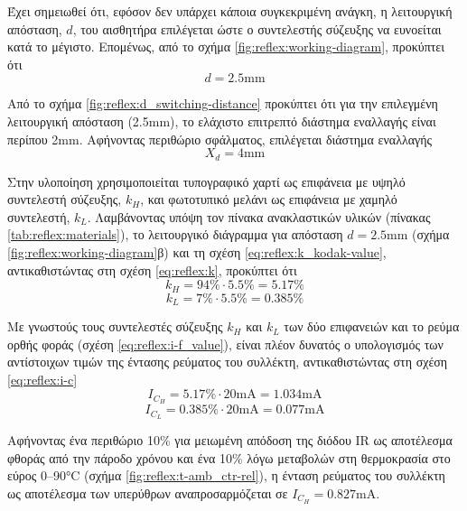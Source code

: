 Έχει σημειωθεί ότι, εφόσον δεν υπάρχει κάποια συγκεκριμένη ανάγκη, η λειτουργική
απόσταση, $d$, του αισθητήρα επιλέγεται ώστε ο συντελεστής σύζευξης να ευνοείται
κατά το μέγιστο. Επομένως, από το σχήμα \ref{fig:reflex:working-diagram},
προκύπτει ότι
\begin{equation}
d = 2.5 \text{mm}
\end{equation}

Από το σχήμα \ref{fig:reflex:d_switching-distance} προκύπτει ότι για την
επιλεγμένη λειτουργική απόσταση (2.5mm), το ελάχιστο επιτρεπτό διάστημα
εναλλαγής είναι περίπου 2mm. Αφήνοντας περιθώριο σφάλματος, επιλέγεται διάστημα
εναλλαγής
\begin{equation}
X_d = 4 \text{mm}
\end{equation}

Στην υλοποίηση χρησιμοποιείται τυπογραφικό χαρτί ως επιφάνεια με υψηλό
συντελεστή σύζευξης, $k_H$, και φωτοτυπικό μελάνι ως επιφάνεια με χαμηλό
συντελεστή, $k_L$.
Λαμβάνοντας υπόψη τον πίνακα ανακλαστικών υλικών
(πίνακας \ref{tab:reflex:materials}), το
λειτουργικό διάγραμμα για απόσταση $d = 2.5$mm
(σχήμα \ref{fig:reflex:working-diagram}β) και τη σχέση
\eqref{eq:reflex:k_kodak-value}, αντικαθιστώντας στη σχέση \eqref{eq:reflex:k},
προκύπτει ότι
\begin{equation}
k_H = 94 \% \cdot 5.5 \% = 5.17 \%
\end{equation}
\begin{equation}
k_L = 7 \% \cdot 5.5 \% = 0.385 \%
\end{equation}

Με γνωστούς τους συντελεστές σύζευξης $k_H$ και $k_L$ των δύο επιφανειών και το
ρεύμα ορθής φοράς (σχέση \eqref{eq:reflex:i-f_value}), είναι πλέον δυνατός ο
υπολογισμός των αντίστοιχων τιμών της έντασης ρεύματος του συλλέκτη,
αντικαθιστώντας στη σχέση \eqref{eq:reflex:i-c}
\begin{equation}
I_{C_H} = 5.17\% \cdot 20 \text{mA} = 1.034 \text{mA}
\end{equation}
\begin{equation}
I_{C_L} = 0.385\% \cdot 20 \text{mA} = 0.077 \text{mA}
\end{equation}

Αφήνοντας ένα περιθώριο 10\% για μειωμένη απόδοση της διόδου IR ως αποτέλεσμα
φθοράς από την πάροδο χρόνου και ένα 10\% λόγω μεταβολών στη θερμοκρασία
στο εύρος 0--90°C (σχήμα \ref{fig:reflex:t-amb_ctr-rel}), η ένταση ρεύματος του
συλλέκτη ως αποτέλεσμα των υπερύθρων αναπροσαρμόζεται σε $I_{C_H} = 0.827$mA.

